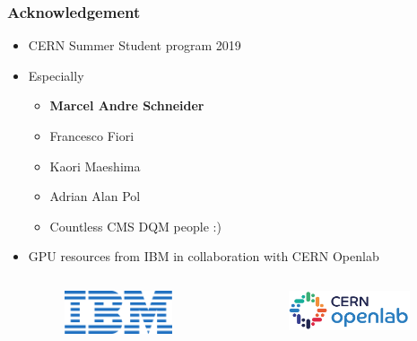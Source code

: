 \documentclass{beamer}
\begin{document}

\begin{frame}
\frametitle{Acknowledgement}
\begin{itemize}
    \item CERN Summer Student program 2019
    \item Especially
    \begin{itemize}
        \item \textbf{Marcel Andre Schneider}
        \item Francesco Fiori
        \item Kaori Maeshima
        \item Adrian Alan Pol
        \item Countless CMS DQM people :)
    \end{itemize}
    \item GPU resources from IBM in collaboration with CERN Openlab
    \begin{columns}
        \begin{figure}
            \includegraphics[width=0.8\textwidth]{images/ibm}
        \end{figure}
        \begin{figure}
            \includegraphics[width=0.9\textwidth]{images/cern_openlab}
        \end{figure}
    \end{columns}
\end{itemize}
\end{frame}
\end{document}
